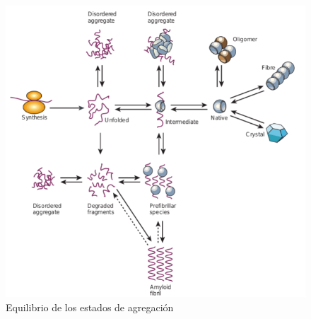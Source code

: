 
\begin{figure}[h!,centered]
\includegraphics[width=\textwidth]{img/aggregationDiagram.png} 
\caption{Equilibrio de los estados de agregación} \label{aggregationDiagram}
\end{figure}


